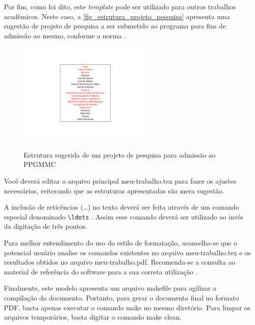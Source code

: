 \begin{apendicesenv}
    Por fim, como foi dito, este \emph{template} pode ser utilizado para outros trabalhos acadêmicos.
    Neste caso, a \autoref{fig_estrutura_projeto_pesquisa} apresenta uma sugestão de projeto de pesquisa a ser submetido ao programa para fins de admissão ao mesmo, conforme a norma .

    \begin{figure}[!htb]
        \centering
        \caption{Estrutura sugerida de um projeto de pesquisa para admissão ao PPGMMC}
        \includegraphics[width=0.6\textwidth]{./figuras/estrutura-projeto-pesquisa}
        \label{fig_estrutura_projeto_pesquisa}
    \end{figure}

    Você deverá editar o arquivo principal {\ttfamily meu-trabalho.tex} para fazer os ajustes necessários, reiterando que as estruturas apresentadas são mera sugestão.

    A inclusão de reticências (\ldots) no texto deverá ser feita através de um comando especial denominado \verb|\ldots| \cite{LaTeX2014}.
    Assim esse comando deverá ser utilizado ao invés da digitação de três pontos.

    Para melhor entendimento do uso do estilo de formatação, aconselha-se que o potencial usuário analise os comandos existentes no arquivo {\ttfamily meu-trabalho.tex} e os resultados obtidos no arquivo {\ttfamily meu-trabalho.pdf}.
    Recomenda-se a consulta ao material de referência do software para a sua correta utilização \cite{Lamport1986,Buerger1989,Kopka2003,Mittelbach2004}.

    Finalmente, este modelo apresenta um arquivo {\ttfamily makefile} para agilizar a compilação do documento.
    Portanto, para gerar o documento final no formato PDF, basta apenas executar o comando {\ttfamily make} no mesmo diretório.
    Para limpar os arquivos temporários, basta digitar o comando {\ttfamily make clean}.


\end{apendicesenv}
